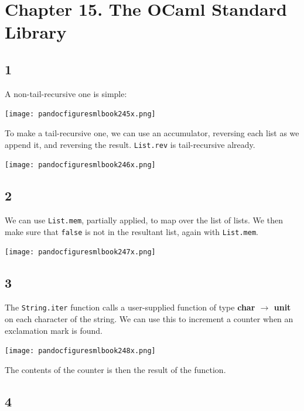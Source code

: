 \documentclass[]{book}
\begin{document}
\section*{Chapter 15. The OCaml Standard Library}
\subsection*{1}
A non-tail-recursive one is simple:

\medskip
\begin{center}
\noindent\texttt{[image: pandocfiguresmlbook245x.png]}
\end{center}
\medskip

\noindent To make a tail-recursive one, we can use an accumulator, reversing each list as we append it, and reversing the result. \texttt{List.rev} is tail-recursive already.

\medskip
\begin{center}
\noindent\texttt{[image: pandocfiguresmlbook246x.png]}
\end{center}
\medskip

\subsection*{2}
We can use \texttt{List.mem}, partially applied, to map over the list of lists. We then make sure that \texttt{false} is not in the resultant list, again with \texttt{List.mem}.

\medskip
\begin{center}
\noindent\texttt{[image: pandocfiguresmlbook247x.png]}
\end{center}
\medskip

\subsection*{3}

The \texttt{String.iter} function calls a user-supplied function of type \textbf{\textsf{char $\rightarrow$ unit}} on each character of the string. We can use this to increment a counter when an exclamation mark is found.

\medskip
\begin{center}
\noindent\texttt{[image: pandocfiguresmlbook248x.png]}
\end{center}
\medskip

\noindent The contents of the counter is then the result of the function.

\subsection*{4}
\end{document}
